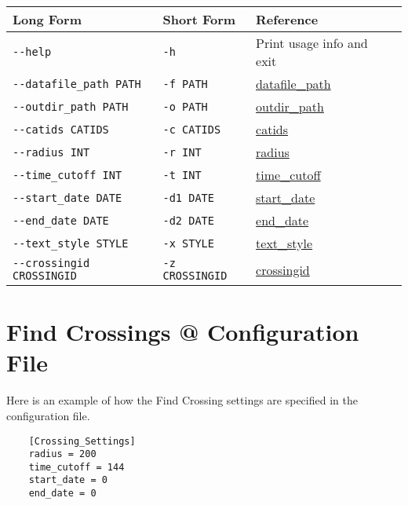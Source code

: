 \begin{table}[h]
\begin{tabular}{|l|l|l|l|}
  \hline
  Long Form & Short Form & Reference \\ \hline \hline

  \verb=--help= & \verb=-h= & Print usage info and exit \\ \hline
  \verb=--datafile_path PATH= & \verb=-f PATH= & \hyperlink{global-datafile-path}{datafile\_path} \\ \hline
  \verb=--outdir_path PATH= & \verb=-o PATH= & \hyperlink{global-outdir-path}{outdir\_path} \\ \hline
  \verb=--catids CATIDS= & \verb=-c CATIDS= & \hyperlink{crossing-catids}{catids} \\ \hline
  \verb=--radius INT= & \verb=-r INT= & \hyperlink{crossing-radius}{radius} \\ \hline
  \verb=--time_cutoff INT= & \verb=-t INT= & \hyperlink{crossing-time-cutoff}{time\_cutoff} \\ \hline
  \verb=--start_date DATE= & \verb=-d1 DATE= & \hyperlink{crossing-start-date}{start\_date} \\ \hline
  \verb=--end_date DATE= & \verb=-d2 DATE= & \hyperlink{crossing-end-date}{end\_date} \\ \hline
  \verb=--text_style STYLE= & \verb=-x STYLE= & \hyperlink{crossing-text-style}{text\_style} \\ \hline
  \verb=--crossingid CROSSINGID= & \verb=-z CROSSINGID= & \hyperlink{crossing-crossingid}{crossingid} \\ \hline

\end{tabular}
\end{table}

\FloatBarrier

\section{Find Crossings @ Configuration File}

Here is an example of how the Find Crossing settings are specified
in the configuration file.

\begin{verbatim}
    [Crossing_Settings]
    radius = 200
    time_cutoff = 144
    start_date = 0
    end_date = 0
\end{verbatim}


